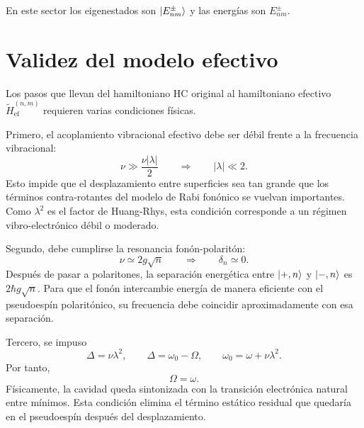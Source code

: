 \documentclass[11pt]{article}
\begin{document}
En este sector los eigenestados son $\ket{E_{nm}^{\pm}}$ y las energ\'ias son
$E_{nm}^{\pm}$.

\section{Validez del modelo efectivo}

Los pasos que llevan del hamiltoniano HC original al hamiltoniano efectivo
$\tilde H_{\mathrm{ef}}^{(n,m)}$ requieren varias condiciones f\'isicas.

Primero, el acoplamiento vibracional efectivo debe ser d\'ebil frente a la
frecuencia vibracional:
\begin{equation}
  \nu\gg\frac{\nu|\lambda|}{2}
  \qquad\Rightarrow\qquad
  |\lambda|\ll2.
\end{equation}
Esto impide que el desplazamiento entre superficies sea tan grande que los
t\'erminos contra-rotantes del modelo de Rabi fon\'onico se vuelvan importantes.
Como $\lambda^2$ es el factor de Huang-Rhys, esta condici\'on corresponde a un
r\'egimen vibro-electr\'onico d\'ebil o moderado.

Segundo, debe cumplirse la resonancia fon\'on-polarit\'on:
\begin{equation}
  \nu\simeq2g\sqrt n
  \qquad\Rightarrow\qquad
  \delta_n\simeq0.
\end{equation}
Despu\'es de pasar a polaritones, la separaci\'on energ\'etica entre
$\ket{+,n}$ y $\ket{-,n}$ es $2\hbar g\sqrt n$. Para que el fon\'on intercambie
energ\'ia de manera eficiente con el pseudoesp\'in polarit\'onico, su
frecuencia debe coincidir aproximadamente con esa separaci\'on.

Tercero, se impuso
\begin{equation}
  \Delta=\nu\lambda^2,
  \qquad
  \Delta=\omega_0-\Omega,
  \qquad
  \omega_0=\omega+\nu\lambda^2.
\end{equation}
Por tanto,
\begin{equation}
  \Omega=\omega.
\end{equation}
F\'isicamente, la cavidad queda sintonizada con la transici\'on electr\'onica
natural entre m\'inimos. Esta condici\'on elimina el t\'ermino est\'atico
residual que quedar\'ia en el pseudoesp\'in despu\'es del desplazamiento.
\end{document}
